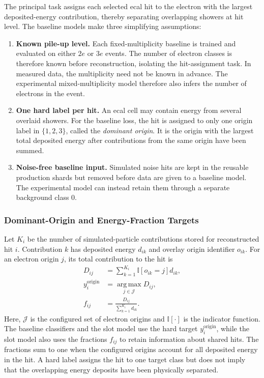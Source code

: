 The principal task assigns each selected \gls{ecal} hit to the electron with
the largest deposited-energy contribution, thereby separating overlapping
showers at hit level. The baseline models make three simplifying assumptions:

\begin{enumerate}
    \item \textbf{Known pile-up level.} Each fixed-multiplicity baseline is
    trained and evaluated on either \(2e\) or \(3e\) events. The number of
    electron classes is therefore known before reconstruction, isolating the
    hit-assignment task. In measured data, the multiplicity need not be known
    in advance. The experimental mixed-multiplicity model therefore also
    infers the number of electrons in the event.

    \item \textbf{One hard label per hit.} An \gls{ecal} cell may contain
    energy from several overlaid showers. For the baseline loss, the hit is
    assigned to only one origin label in \(\{1,2,3\}\), called the
    \textit{dominant origin}. It is the origin with the largest total
    deposited energy after contributions from the same origin have been summed.

    \item \textbf{Noise-free baseline input.} Simulated noise hits are kept in
    the reusable production shards but removed before data are given to a
    baseline model. The experimental model can instead retain them through a
    separate background class \(0\).
\end{enumerate}

\subsubsection{Dominant-Origin and Energy-Fraction Targets}

Let \(K_i\) be the number of simulated-particle contributions stored for
reconstructed hit \(i\). Contribution \(k\) has deposited energy \(d_{ik}\)
and overlay origin identifier \(o_{ik}\). For an electron origin \(j\), its
total contribution to the hit is
\begin{align}
    D_{ij}
    &=
    \sum_{k=1}^{K_i}
    \mathbb{I}\!\left[o_{ik}=j\right]d_{ik}, \\
    y_i^{\mathrm{origin}}
    &=
    \operatorname*{arg\,max}_{j\in\mathcal{J}}D_{ij},
    \label{eq:dominant_origin_target}\\
    f_{ij}
    &=
    \frac{D_{ij}}{\sum_{k=1}^{K_i}d_{ik}} .
    \label{eq:origin_fraction_target}
\end{align}
Here, \(\mathcal{J}\) is the configured set of electron origins and
\(\mathbb{I}[\cdot]\) is the indicator function. The baseline classifiers and
the slot model use the hard target \(y_i^{\mathrm{origin}}\), while the slot
model also uses the fractions \(f_{ij}\) to retain information about shared
hits. The fractions sum to one when the configured origins account for all
deposited energy in the hit. A hard label assigns the hit to one target class
but does not imply that the overlapping energy deposits have been physically
separated.

